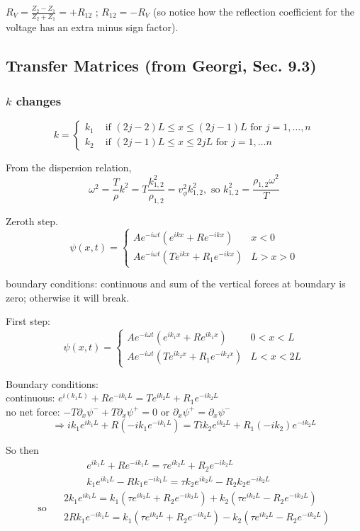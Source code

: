 \documentclass[twoside, 10pt]{amsart}
\begin{document}
$R_V = \frac{Z_2 - Z_1 }{ Z_2 + Z_1 } = +R_{12} $ ; \quad $R_{12} = -R_V$ (so notice how the reflection coefficient for the voltage has an extra minus sign factor).  

\subsection{Transfer Matrices (from Georgi, Sec. 9.3)}

\subsubsection*{$k$ changes}

\[
k = 
\begin{cases}
  k_1 & \text{ if } (2j-2)L \leq x \leq (2j-1)L \text{ for } j = 1, \dots, n \\ 
  k_2 & \text{ if } (2j-1)L \leq x \leq 2jL \text{ for } j = 1, \dots n 
\end{cases}
\]

From the dispersion relation, 
\[
\omega^2 = \frac{T}{\rho} k^2 = T \frac{ k_{1,2}^2 }{ \rho_{1,2} } = v_{\phi}^2 k_{1,2}^2, \text{ so } k_{1,2}^2 = \frac{ \rho_{1,2} \omega^2 }{T} 
\]

Zeroth step.  
\[
\psi(x,t) = \begin{cases} A e^{ -i \omega t} (e^{ikx} + R e^{-ikx} ) & x < 0 \\ Ae^{-i\omega t} (T e^{ikx} + R_1 e^{-ikx} ) & L > x > 0 \end{cases} 
\]

boundary conditions: continuous and sum of the vertical forces at boundary is zero; otherwise it will break.  

First step:
\[
\psi(x,t) = \begin{cases} A e^{-i\omega t} (e^{i k_1 x} + Re^{ik_1 x} ) & 0 < x < L \\ Ae^{-i\omega t} (T e^{ik_2 x} + R_1 e^{-ik_2 x} ) & L < x < 2L \end{cases}
\]

Boundary conditions: \\
continuous: $e^{i(k_1 L)} + R e^{-ik_1 L } = Te^{ik_2 L} + R_1 e^{-ik_2 L } $ \\ 
no net force: $ -T \partial_x \psi^- + T \partial_x \psi^+ = 0 $ or $ \partial_x \psi^+ = \partial_x \psi^-$
\[
\Longrightarrow i k_1 e^{i k_1 L} + R ( -ik_1 e^{-ik_1 L }) = T ik_2 e^{ik_2 L } + R_1 (-ik_2 )e^{-ik_2 L } 
\]

So then
\[
\begin{gathered}
e^{ik_1 L} + R e^{-ik_1 L } = \tau e^{ik_2 L } + R_2 e^{-ik_2 L } \\ 
k_1 e^{ik_1 L } - Rk_1 e^{-ik_1 L } = \tau k_2 e^{ik_2 L } - R_2 k_2 e^{-ik_2 L } \end{gathered} \quad \, 
\]
\[
\text{ so } \quad \begin{gathered}
  2 k_1 e^{ik_1 L  } = k_1 ( \tau e^{ik_2 L } + R_2 e^{-ik_2 L } ) + k_2 (\tau e^{ik_2 L } - R_2 e^{-ik_2 L } ) \\ 
  2 R k_1 e^{-ik_1 L } = k_1 ( \tau e^{ik_2 L } + R_2 e^{-ik_2 L } ) - k_2 (\tau e^{ik_2 L } - R_2 e^{-ik_2 L } )
\end{gathered}
\]
\end{document}
